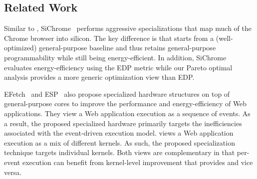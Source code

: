 \subsection{Related Work}
\label{sec:arch:related}

Similar to \webcore, SiChrome~\cite{SiChrome} performs aggressive specializations that map much of the Chrome browser into silicon. The key difference is that \webcore starts from a (well-optimized) general-purpose baseline and thus retains general-purpose programmability while still being energy-efficient. In addition, SiChrome evaluates energy-efficiency using the EDP metric while our Pareto optimal analysis provides a more generic optimization view than EDP.

EFetch~\cite{efetch} and ESP~\cite{esp} also propose specialized hardware structures on top of general-purpose cores to improve the performance and energy-efficiency of Web applications. They view a Web application execution as a sequence of events. As a result, the proposed specialized hardware primarily targets the inefficiencies associated with the event-driven execution model. \webcore views a Web application execution as a mix of different kernels. As such, the proposed specialization technique targets individual kernels. Both views are complementary in that per-event execution can benefit from kernel-level improvement that \webcore provides and vice versa.

